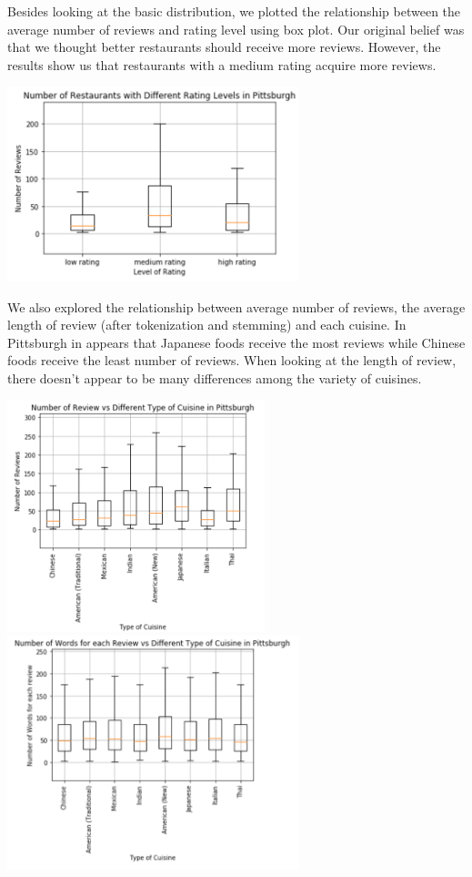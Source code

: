 \documentclass{neu_handout}
\begin{document}
Besides looking at the basic distribution, we plotted the relationship between the average number of reviews and rating level using box plot. Our original belief was that we thought better restaurants should receive more reviews. However, the results show us that restaurants with a medium rating acquire more reviews. 

\begin{center}
	\includegraphics[width=85mm,scale=0.3]{number_of_restaurants_vs_rating_level}
\end{center}

We also explored the relationship between average number of reviews, the average length of review (after tokenization and stemming) and each cuisine. In Pittsburgh in appears that Japanese foods receive the most reviews while Chinese foods receive the least number of reviews. When looking at the length of review, there doesn't appear to be many differences among the variety of cuisines. 

\begin{center}
	\includegraphics[width=75mm,scale=0.3]{number_of_review_vs_cuisine}
	\includegraphics[width=85mm,scale=0.3]{average_review_length}
\end{center}
\end{document}
